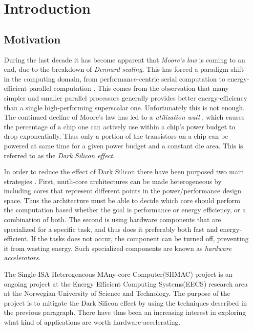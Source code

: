\chapter{Introduction}

\section{Motivation}

During the last decade it has become apparent that \textit{Moore's law} is coming to an end, due to the breakdown of \textit{Dennard scaling.} This has forced a paradigm shift  in the computing domain, from performance-centric serial computation to energy-efficient parallel computation \cite{Duranton2013}. This comes from the observation that many simpler and smaller parallel processors generally provides better energy-efficiency than a single high-performing superscalar one. Unfortunately this is not enough. The continued decline of Moore's law has led to a \textit{utilization wall} \cite{Venkatesh2010}, which causes the percentage of a chip one can actively use within a chip's power budget to drop exponentially. Thus only a portion of the transistors on a chip can be powered at same time for a given power budget and a constant die
area. This is referred to as the \textit{Dark Silicon effect}.

In order to reduce the effect of Dark Silicon there have been purposed two main strategies \cite{Olukotun2011}. First, mutli-core architectures can be made heterogeneous by including cores that represent different points in the power/performance design space. Thus the architecture must be able to decide which core should perform the computation based whether the goal is performance or energy efficiency, or a combination of both. The second is using hardware components that are specialized for a specific task, and thus does it preferably both fast and energy-efficient. If the tasks does not occur, the component can be turned off, preventing it from wasting energy. Such specialized components are known as \textit{hardware accelerators}. 


The Single-ISA Heterogeneous MAny-core Computer(SHMAC) \cite{NTNU2014} project is an ongoing project at the Energy Efficient Computing Systems(EECS) research area at the Norwegian University of Science and Technology. The purpose of the project is to mitigate the Dark Silicon effect by using the techniques described in the previous paragraph. There have thus been an increasing interest in exploring what kind of applications are worth hardware-accelerating. 

